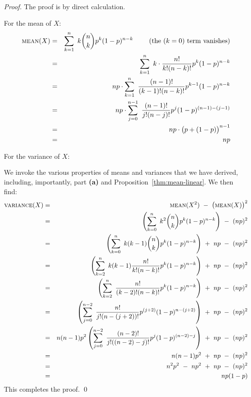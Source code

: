 \begin{proof}
The proof is by direct calculation.

\smallskip

 For the mean of $X$:
\begin{eqnarray*} 
\mbox{\sc mean}(X) & = &
\sum_{k=1}^n \ k {n \choose k} p^k (1-p)^{n-k} \ \ \ \ \ \ \ \mbox{(the $(k=0)$ term vanishes)} \\
  & = &
\sum_{k=1}^n \ k \cdot \frac{n!}{k! (n-k)!} p^k (1-p)^{n-k} \\
  & = &
np \cdot \sum_{k=1}^n \ \frac{(n-1)!}{(k-1)! (n-k)!} p^{k-1} (1-p)^{n-k} \\
  & = &
np \cdot \sum_{j=0}^{n-1} \ \frac{(n-1)!}{j! (n-j)!} p^{j} (1-p)^{(n-1)-(j-1)} \\
  & = &
np \cdot \big(p + (1-p) \big)^{n-1} \\
  & = &
np
\end{eqnarray*}

 For the variance of $X$:

We invoke the various properties of means and variances that we have derived, including, importantly, part {\bf (a)} and Proposition~\ref{thm:mean-linear}.  We then find:
\begin{eqnarray*} 
\mbox{\sc variance}(X) & = & 
\mbox{\sc mean}(X^2) \ - \  \big(\mbox{\sc mean}(X) \big)^2 \\
  & = &
\left( \sum_{k=0}^n \ k^2 {n \choose k} p^k (1-p)^{n-k} \right)
 \ - \ (np)^2  \\
  & = &
\left( \sum_{k=0}^n \ k(k-1) {n \choose k} p^k (1-p)^{n-k} \right)
 \ + \ np
 \ - \ (np)^2  \\
  & = &
\left( \sum_{k=2}^n \ k(k-1) \frac{n!}{k! (n-k)!} p^k (1-p)^{n-k} \right)
 \ + \ np
 \ - \ (np)^2  \\
  & = &
\left( \sum_{k=2}^n \ \frac{n!}{(k-2)! (n-k)!} p^k (1-p)^{n-k} \right)
 \ + \ np
 \ - \ (np)^2 \\
  & = &
\left( \sum_{j=0}^{n-2} \ \frac{n!}{j! (n-(j+2))!} p^{(j+2)} (1-p)^{n-(j+2)} \right)
 \ + \ np
 \ - \ (np)^2 \\
   & = &
n(n-1)p^2 \left( \sum_{j=0}^{n-2} \ \frac{(n-2)!}{j! ((n-2)-j)!} p^j (1-p)^{(n-2)-j} \right)
 \ + \ np
 \ - \ (np)^2 \\
     & = &
n(n-1)p^2  \ + \ np \ - \ (np)^2 \\
     & = &
n^2 p^2 \ - \ n p^2  \ + \ np \ - \ (np)^2 \\
     & = &
n p (1-p)
\end{eqnarray*}
This completes the proof. \qed
\end{proof}

